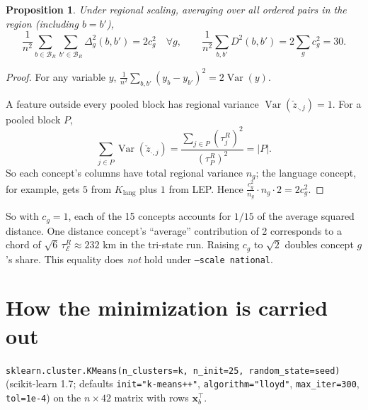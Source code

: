 \documentclass[11pt]{article}
\newcommand{\x}{\mathbf{x}}
\newcommand{\Var}{\operatorname{Var}}
\newtheorem*{prop}{Proposition}
\begin{document}
\begin{prop}
Under regional scaling, averaging over all ordered pairs in the region (including $b=b'$),
\[
\frac1{n^2}\sum_{b\in\mathcal B_R}\sum_{b'\in\mathcal B_R}\Delta^2_g(b,b')=2c_g^2
\quad\forall g,
\qquad
\frac1{n^2}\sum_{b,b'}D^2(b,b')=2\sum_{g}c_g^2=30 .
\]
\end{prop}
\begin{proof}
For any variable $y$, $\frac1{n^2}\sum_{b,b'}(y_b-y_{b'})^2=2\Var(y)$.

A feature outside every pooled block has regional variance $\Var(\check z_{\cdot,j})=1$. For a
pooled block $P$,
\[
\sum_{j\in P}\Var(\check z_{\cdot,j})=\frac{\sum_{j\in P}(\tau^R_j)^2}{(\tau^R_P)^2}=|P|.
\]
So each concept's columns have total regional variance $n_g$; the language concept, for
example, gets $5$ from $K_{\text{lang}}$ plus $1$ from LEP. Hence
$\frac{c_g^2}{n_g}\cdot n_g\cdot2=2c_g^2$.
\end{proof}
So with $c_g=1$, each of the 15 concepts accounts for $1/15$ of the average squared
distance. One distance concept's ``average'' contribution of 2 corresponds to a chord of
$\sqrt6\,\tau^R_{\mathcal E}\approx232$ km in the tri-state run. Raising $c_g$ to $\sqrt2$
doubles concept $g$'s share. This equality does \emph{not} hold under \texttt{--scale national}.

\section{How the minimization is carried out}

\texttt{sklearn.cluster.KMeans(n\_clusters=k, n\_init=25, random\_state=seed)}
(scikit-learn 1.7; defaults \texttt{init="k-means++"}, \texttt{algorithm="lloyd"},
\texttt{max\_iter=300}, \texttt{tol=1e-4}) on the $n\times42$ matrix with rows $\x_b^\top$.
\end{document}
